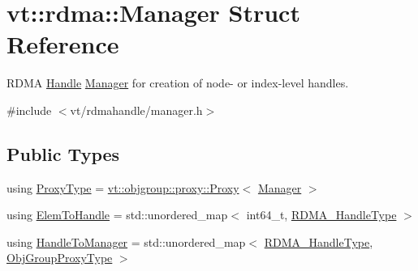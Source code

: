 \hypertarget{structvt_1_1rdma_1_1_manager}{}\section{vt\+:\+:rdma\+:\+:Manager Struct Reference}
\label{structvt_1_1rdma_1_1_manager}


R\+D\+MA \hyperlink{structvt_1_1rdma_1_1_handle}{Handle} \hyperlink{structvt_1_1rdma_1_1_manager}{Manager} for creation of node-\/ or index-\/level handles.  




{\ttfamily \#include $<$vt/rdmahandle/manager.\+h$>$}

\subsection*{Public Types}
\begin{DoxyCompactItemize}
\item 
using \hyperlink{structvt_1_1rdma_1_1_manager_a75d5cdc6428ea19f5ec665b04dcd7166}{Proxy\+Type} = \hyperlink{structvt_1_1objgroup_1_1proxy_1_1_proxy}{vt\+::objgroup\+::proxy\+::\+Proxy}$<$ \hyperlink{structvt_1_1rdma_1_1_manager}{Manager} $>$
\item 
using \hyperlink{structvt_1_1rdma_1_1_manager_ad794893058cec7595bc2bcb466ce7d3f}{Elem\+To\+Handle} = std\+::unordered\+\_\+map$<$ int64\+\_\+t, \hyperlink{namespacevt_a10442579ec4e7ebef223818e64bcf908}{R\+D\+M\+A\+\_\+\+Handle\+Type} $>$
\item 
using \hyperlink{structvt_1_1rdma_1_1_manager_aac6e7c58d320c302ea08461941d65f6e}{Handle\+To\+Manager} = std\+::unordered\+\_\+map$<$ \hyperlink{namespacevt_a10442579ec4e7ebef223818e64bcf908}{R\+D\+M\+A\+\_\+\+Handle\+Type}, \hyperlink{namespacevt_ad7cae989df485fccca57f0792a880a8e}{Obj\+Group\+Proxy\+Type} $>$
\end{DoxyCompactItemize}

